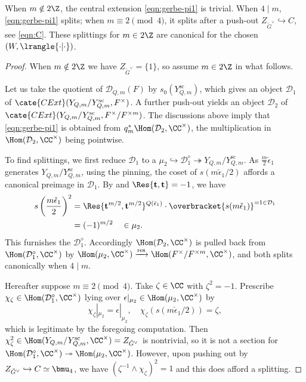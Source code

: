 \documentclass[a4paper,10pt]{article}
\begin{document}
\begin{lemma}\label{prop:gerbe-splitting}
	When $m \notin 2\Z$, the central extension \eqref{eqn:gerbe-pi1} is trivial. When $4 \mid m$, \eqref{eqn:gerbe-pi1} splits; when $m \equiv 2 \pmod 4$, it splits after a push-out $Z_{\tilde{G}^\vee} \hookrightarrow C$, see \eqref{eqn:C}. These splittings for $m \in 2\Z$ are canonical for the chosen $(W, \lrangle{\cdot|\cdot})$.
\end{lemma}
\begin{proof}
	When $m \notin 2\Z$ we have $Z_{\tilde{G}^\vee} = \{1\}$, so assume $m \in 2\Z$ in what follows.
	
	Let us take the quotient of $\mathcal{D}_{Q,m}(F)$ by $s_0(Y_{Q,m}^\text{sc})$, which gives an object $\mathcal{D}_1$ of $\cate{CExt}(Y_{Q,m}/Y_{Q,m}^\text{sc}, F^\times)$. A further push-out yields an object $\mathcal{D}_2$ of $\cate{CExt}(Y_{Q,m}/Y_{Q,m}^\text{sc}, F^\times/F^{\times m})$. The discussions above imply that \eqref{eqn:gerbe-pi1} is obtained from $q_m^* \Hom(\mathcal{D}_2, \CC^\times)$, the multiplication in $\Hom(\mathcal{D}_2, \CC^\times)$ being pointwise.
	
	To find splittings, we first reduce $\mathcal{D}_1$ to a $\mu_2 \hookrightarrow \mathcal{D}_1^\diamond \twoheadrightarrow Y_{Q,m}/Y_{Q,m}^\text{sc}$. As $\frac{m}{2}\check{\epsilon}_1$ generates $Y_{Q,m}/Y_{Q,m}^\text{sc}$, using the pinning, the coset of $s(m\check{\epsilon}_1/2)$ affords a canonical preimage in $\mathcal{D}_1$. By \cite[(11.1.4)---(11.1.5)]{BD01} and $\Res\{\mathbf{t}, \mathbf{t}\} = -1$, we have
	\begin{align*}
		s\left( \frac{m\check{\epsilon}_1}{2} \right)^2 & = \Res\{ \mathbf{t}^{m/2}, \mathbf{t}^{m/2} \}^{Q(\check{\epsilon}_1)} \cdot \overbracket{ s(m\check{\epsilon}_1) }^{=1 \in \mathcal{D}_1} \\
		& = (-1)^{m/2} \quad \in \mu_2.
	\end{align*}
	This furnishes the $\mathcal{D}_1^\diamond$. Accordingly $\Hom(\mathcal{D}_2, \CC^\times)$ is pulled back from $\Hom(\mathcal{D}_1^\diamond, \CC^\times)$ by $\Hom(\mu_2, \CC^\times) \xrightarrow{\text{res}} \Hom(F^\times/F^{\times m}, \CC^\times)$, and both splits canonically when $4 \mid m$.
	
	Hereafter suppose $m \equiv 2 \pmod 4$. Take $\zeta \in \CC$ with $\zeta^2 = -1$. Prescribe $\chi_\zeta \in \Hom(\mathcal{D}_1^\diamond, \CC^\times)$ lying over $\epsilon|_{\mu_2} \in \Hom(\mu_2, \CC^\times)$ by
	\[ \chi_\zeta|_{\mu_2} = \epsilon|_{\mu_2}, \quad \chi_\zeta(s(m\check{\epsilon}_1/2)) = \zeta, \]
	which is legitimate by the foregoing computation. Then $\chi_\zeta^2 \in \Hom(Y_{Q,m}/Y_{Q,m}^\text{sc}, \CC^\times) = Z_{\tilde{G}^\vee}$ is nontrivial, so it is not a section for $\Hom(\mathcal{D}_1^\diamond, \CC^\times) \twoheadrightarrow \Hom(\mu_2, \CC^\times)$. However, upon pushing out by $Z_{\tilde{G}^\vee} \hookrightarrow C \simeq \bmu_4$, we have $(\zeta^{-1} \wedge \chi_\zeta)^2 = 1$ and this does afford a splitting.
	

\end{proof}
\end{document}
